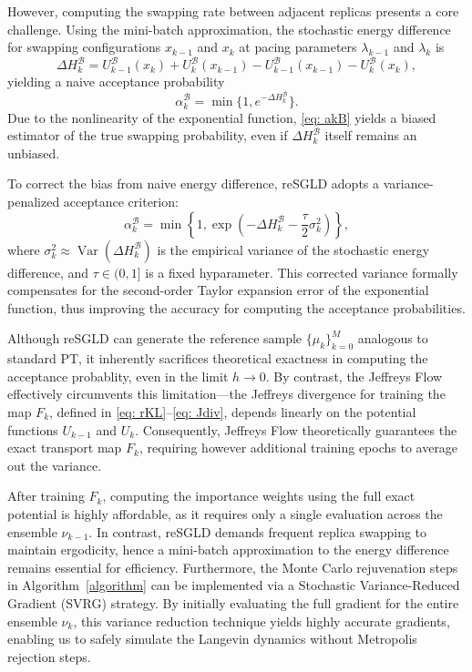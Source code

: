 \documentclass[%
 reprint,
 amsmath,amssymb,
 aps,
 pre,
]{revtex4-2}
\DeclareMathOperator{\Var}{Var}
\begin{document}
However, computing the swapping rate between adjacent replicas presents a core challenge. Using the mini-batch approximation, the stochastic energy difference for swapping configurations $x_{k-1}$ and $x_k$ at pacing parameters $\lambda_{k-1}$ and $\lambda_k$ is
\begin{equation*}
	\Delta H_k^{\mathcal B} = U_{k-1}^{\mathcal B}(x_k) + U_k^{\mathcal B}(x_{k-1}) - U_{k-1}^{\mathcal B}(x_{k-1}) - U_k^{\mathcal B}(x_k),
\end{equation*}
yielding a naive acceptance probability
\begin{equation}
\alpha_k^{\mathcal B} = \min\big\{1, e^{-\Delta H_k^{\mathcal B}}\big\}.
\label{eq: akB}
\end{equation} 
Due to the nonlinearity of the exponential function, \eqref{eq: akB} yields a biased estimator of the true swapping probability, even if $\Delta H_k^{\mathcal B}$ itself remains an unbiased.

To correct the bias from naive energy difference, reSGLD adopts a variance-penalized acceptance criterion:
\begin{equation}
    \alpha_k^{\mathcal B} = \min \left\{ 1, \exp\left(-\Delta H_k^{\mathcal B} - \frac{\tau}{2} \sigma_k^2\right) \right\},
\end{equation}
where $\sigma_k^2\approx \Var(\Delta H_k^{\mathcal B})$ is the empirical variance of the stochastic energy difference, and $\tau \in (0, 1]$ is a fixed hyparameter. This corrected variance formally compensates for the second-order Taylor expansion error of the exponential function, thus improving the accuracy for computing the acceptance probabilities.

Although reSGLD can generate the reference sample $\{\mu_k\}_{k=0}^M$ analogous to standard PT, it inherently sacrifices theoretical exactness in computing the acceptance probablity, even in the limit $h \to 0$. By contrast, the Jeffreys Flow effectively circumvents this limitation---the Jeffreys divergence for training the map $F_k$, defined in \eqref{eq: rKL}--\eqref{eq: Jdiv}, depends linearly on the potential functions $U_{k-1}$ and $U_k$. Consequently, Jeffreys Flow theoretically guarantees the exact transport map $F_k$, requiring however additional training epochs to average out the variance.

After training $F_k$, computing the importance weights using the full exact potential is highly affordable, as it requires only a single  evaluation across the ensemble $\nu_{k-1}$. In contrast, reSGLD demands frequent replica swapping to maintain ergodicity, hence a mini-batch approximation to the energy difference remains essential for efficiency. Furthermore, the Monte Carlo rejuvenation steps in Algorithm~\ref{algorithm} can be implemented via a Stochastic Variance-Reduced Gradient (SVRG) \cite{johnson2013accelerating,reddi2016stochastic} strategy. By initially evaluating the full gradient for the entire ensemble $\nu_k$, this variance reduction technique yields highly accurate gradients, enabling us to safely simulate the Langevin dynamics without Metropolis rejection steps.
\end{document}
